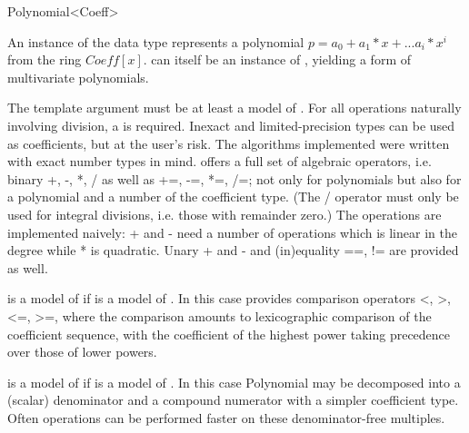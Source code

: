 
\begin{ccRefClass}{Polynomial<Coeff>}
\def\ccTagOperatorLayout{\ccFalse}

\ccDefinition

An instance of the data type  represents a
polynomial $p = a_0 + a_1*x + ...a_i*x^i$ from the ring $Coeff[x]$.
 can itself be an instance of , yielding a form of
multivariate polynomials. 

The template argument  must be at 
least a model of .
For all operations naturally involving division, a  
is required. 
Inexact and limited-precision types can be used as coefficients,
but at the user's risk. The algorithms implemented were written with
exact number types in mind.
 offers a full set of algebraic operators, i.e.
binary +, -, *, / as well as +=, -=, *=, /=; not only for polynomials
but also for a polynomial and a number of the coefficient type.
(The / operator must only be used for integral divisions, i.e.
those with remainder zero.)
The operations are implemented naively: + and - need a number of 
operations which is linear in the degree while * is quadratic.
Unary + and - and (in)equality ==, != are provided as well.

 is a model of  if  is a 
model of . In this case  provides 
comparison operators <, >, <=, >=, where the comparison amounts to 
lexicographic comparison of the coefficient sequence,
with the coefficient of the highest power taking precedence over
those of lower powers.

 is a model of  if  is a 
model of . In this case Polynomial may be decomposed into a 
(scalar) denominator and a compound numerator with a simpler coefficient type. 
Often operations can be performed faster on these denominator-free multiples. 


\end{ccRefClass}
